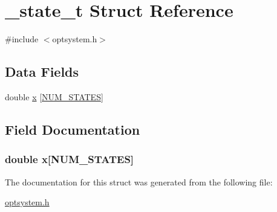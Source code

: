 \hypertarget{a00007}{\section{\-\_\-state\-\_\-t \-Struct \-Reference}
\label{de/d5e/a00007}
}


{\ttfamily \#include $<$optsystem.\-h$>$}

\subsection*{\-Data \-Fields}
\begin{DoxyCompactItemize}
\item 
double \hyperlink{a00007_ab1632e02642e8b20f337b10daa3cf5c2_ab1632e02642e8b20f337b10daa3cf5c2}{x} \mbox{[}\hyperlink{a00018_a6e67a587012cd0570839daca590cf822_a6e67a587012cd0570839daca590cf822}{\-N\-U\-M\-\_\-\-S\-T\-A\-T\-E\-S}\mbox{]}
\end{DoxyCompactItemize}


\subsection{\-Field \-Documentation}
\hypertarget{a00007_ab1632e02642e8b20f337b10daa3cf5c2_ab1632e02642e8b20f337b10daa3cf5c2}{
\subsubsection[{x}]{\setlength{\rightskip}{0pt plus 5cm}double {\bf x}\mbox{[}{\bf \-N\-U\-M\-\_\-\-S\-T\-A\-T\-E\-S}\mbox{]}}}\label{de/d5e/a00007_ab1632e02642e8b20f337b10daa3cf5c2_ab1632e02642e8b20f337b10daa3cf5c2}


\-The documentation for this struct was generated from the following file\-:\begin{DoxyCompactItemize}
\item 
\hyperlink{a00018}{optsystem.\-h}\end{DoxyCompactItemize}
